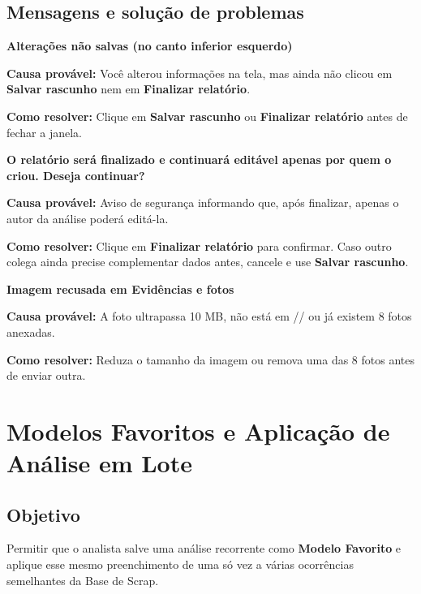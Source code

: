 \subsection*{Mensagens e solução de problemas}

\begin{remark}
\textbf{\textbullet{} Alterações não salvas (no canto inferior esquerdo)}\par
\textbf{Causa provável:} Você alterou informações na tela, mas ainda não clicou em \textbf{Salvar rascunho} nem em \textbf{Finalizar relatório}.\par
\textbf{Como resolver:} Clique em \textbf{Salvar rascunho} ou \textbf{Finalizar relatório} antes de fechar a janela.
\end{remark}

\begin{remark}
\textbf{O relatório será finalizado e continuará editável apenas por quem o criou. Deseja continuar?}\par
\textbf{Causa provável:} Aviso de segurança informando que, após finalizar, apenas o autor da análise poderá editá-la.\par
\textbf{Como resolver:} Clique em \textbf{Finalizar relatório} para confirmar. Caso outro colega ainda precise complementar dados antes, cancele e use \textbf{Salvar rascunho}.
\end{remark}

\begin{remark}
\textbf{Imagem recusada em Evidências e fotos}\par
\textbf{Causa provável:} A foto ultrapassa 10 MB, não está em // ou já existem 8 fotos anexadas.\par
\textbf{Como resolver:} Reduza o tamanho da imagem ou remova uma das 8 fotos antes de enviar outra.
\end{remark}

\section{Modelos Favoritos e Aplicação de Análise em Lote}

\subsection*{Objetivo}

Permitir que o analista salve uma análise recorrente como \textbf{Modelo Favorito} e aplique esse mesmo preenchimento de uma só vez a várias ocorrências semelhantes da Base de Scrap.\par

